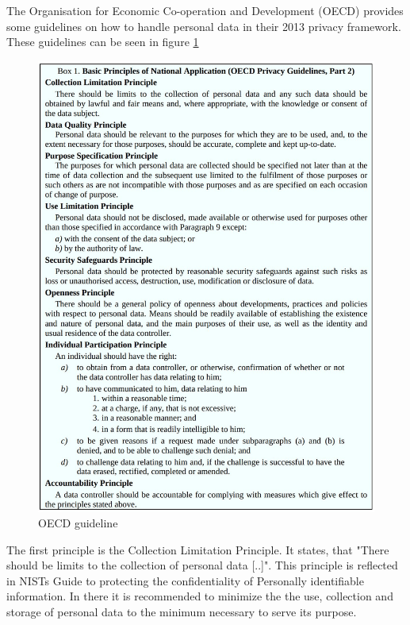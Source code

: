         The Organisation for Economic Co-operation and Development (OECD) provides some guidelines on how to handle personal data in their 2013 privacy framework\cite{oecd_oecd_2013}. These guidelines can be seen in figure \ref{fig:oecd_guide} 
        \begin{figure}
            \centering
            \includegraphics[width=\textwidth]{latex/figures/oecd_guidelines.jpg}
            \caption[OECD guideline]{OECD guideline\cite{oecd_oecd_2013}}
            \label{fig:oecd_guide}
        \end{figure}
        The first principle is the Collection Limitation Principle. It states, that "There should be limits to the collection of personal data [..]"\cite{oecd_oecd_2013}. This principle is reflected in NISTs Guide to protecting the confidentiality of Personally identifiable information\cite{mccallister_guide_2010}. In there it is recommended to minimize the the use, collection and storage of personal data to the minimum necessary to serve its purpose.

